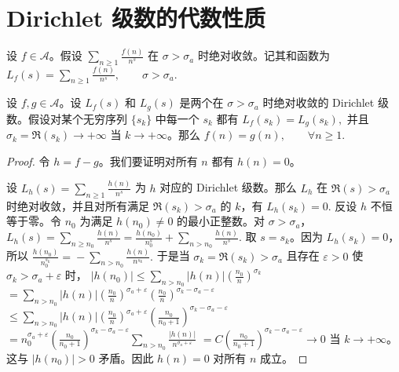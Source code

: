 \section{Dirichlet 级数的代数性质}

设 $f\in\mathcal A$。假设
\(\textstyle \sum_{n\geq\allowbreak{} 1}\frac{f(n)}{n^s}\)
在 $\sigma>\sigma_a$ 时绝对收敛。记其和函数为
\(\textstyle L_f(s)=\allowbreak{}\sum_{n\geq\allowbreak{} 1}\frac{f(n)}{n^s},\allowbreak{} \qquad \sigma>\sigma_a.\)

\begin{theorem}[原文 Theorem 4.5]
	设 $f,g\in\mathcal A$。设 $L_f(s)$ 和 $L_g(s)$ 是两个在 $\sigma>\sigma_a$ 时绝对收敛的 Dirichlet 级数。假设对某个无穷序列 $\{s_k\}$ 中每一个 $s_k$ 都有
	\(\textstyle L_f(s_k)=\allowbreak{}L_g(s_k),\allowbreak{}\)
	并且 $\sigma_k=\Re(s_k)\to+\infty$ 当 $k\to+\infty$。那么
	\(\textstyle f(n)=\allowbreak{}g(n),\allowbreak{}\qquad \forall n\geq\allowbreak{} 1.\)
\end{theorem}

\begin{proof}
	令 $h=f-g$。我们要证明对所有 $n$ 都有 $h(n)=0$。

	设
	\(\textstyle L_h(s)=\allowbreak{}\sum_{n\geq\allowbreak{} 1}\frac{h(n)}{n^s}\)
	为 $h$ 对应的 Dirichlet 级数。那么 $L_h$ 在 $\Re(s)>\sigma_a$ 时绝对收敛，并且对所有满足 $\Re(s_k)>\sigma_a$ 的 $k$，有
	\(\textstyle L_h(s_k)=\allowbreak{}0.\)
	反设 $h$ 不恒等于零。令 $n_0$ 为满足 $h(n_0)\neq 0$ 的最小正整数。对 $\sigma>\sigma_a$，
	\(\textstyle L_h(s) =\allowbreak{} \sum_{n\geq\allowbreak{} n_0}\frac{h(n)}{n^s} =\allowbreak{} \frac{h(n_0)}{n_0^s} +\allowbreak{} \sum_{n>n_0}\frac{h(n)}{n^s}.\)
	取 $s=s_k$。因为 $L_h(s_k)=0$，所以
	\(\textstyle \frac{h(n_0)}{n_0^{s_k}} =\allowbreak{} - \sum_{n>n_0}\frac{h(n)}{n^{s_k}}.\)
	于是当 $\sigma_k=\Re(s_k)>\sigma_a$ 且存在 $\varepsilon>0$ 使 $\sigma_k>\sigma_a+\varepsilon$ 时，
	\(\textstyle |h(n_0)| \leq\allowbreak{} \sum_{n>n_0}|h(n)|\left(\frac{n_0}{n}\right)^{\sigma_k}\) \(\textstyle =\allowbreak{} \sum_{n>n_0}|h(n)| \left(\frac{n_0}{n}\right)^{\sigma_a+\allowbreak{}\varepsilon} \left(\frac{n_0}{n}\right)^{\sigma_k-\sigma_a-\varepsilon}\) \(\textstyle \leq\allowbreak{} \sum_{n>n_0}|h(n)| \left(\frac{n_0}{n}\right)^{\sigma_a+\allowbreak{}\varepsilon} \left(\frac{n_0}{n_0+\allowbreak{}1}\right)^{\sigma_k-\sigma_a-\varepsilon}\) \(\textstyle =\allowbreak{} n_0^{\sigma_a+\allowbreak{}\varepsilon} \left(\frac{n_0}{n_0+\allowbreak{}1}\right)^{\sigma_k-\sigma_a-\varepsilon} \sum_{n>n_0}\frac{|h(n)|}{n^{\sigma_a+\allowbreak{}\varepsilon}}\) \(\textstyle =\allowbreak{} C\left(\frac{n_0}{n_0+\allowbreak{}1}\right)^{\sigma_k-\sigma_a-\varepsilon} \longrightarrow\allowbreak{} 0\)
	当 $k\to+\infty$。这与 $|h(n_0)|>0$ 矛盾。因此 $h(n)=0$ 对所有 $n$ 成立。
\end{proof}

